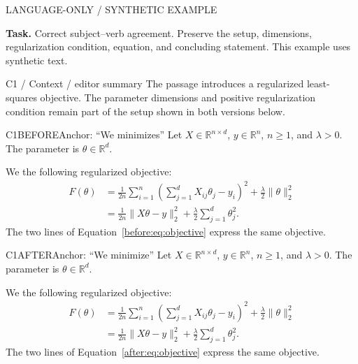 \documentclass[11pt]{article}
\begin{document}
{\small\color{rcMuted}LANGUAGE-ONLY / SYNTHETIC EXAMPLE}

\textbf{Task.} Correct subject--verb agreement. Preserve the setup, dimensions,
regularization condition, equation, and concluding statement.
This example uses synthetic text.

\begin{rcContext}{C1 / Context / editor summary}
The passage introduces a regularized least-squares objective. The parameter
dimensions and positive regularization condition remain part of the setup
shown in both versions below.
\end{rcContext}

\begin{rcPassage}{C1}{BEFORE}{Anchor: ``We minimizes''}
\renewcommand{\theequation}{B\arabic{equation}}
\renewcommand{\theHequation}{before.\arabic{equation}}
\setcounter{equation}{0}
Let $X\in\mathbb{R}^{n\times d}$, $y\in\mathbb{R}^{n}$,
$n\geq 1$, and $\lambda>0$. The parameter is $\theta\in\mathbb{R}^d$.

We  the following regularized objective:
\begin{align}
F(\theta)
 &= \frac{1}{2n}\sum_{i=1}^{n}
    \left(\sum_{j=1}^{d}X_{ij}\theta_j-y_i\right)^2
    +\frac{\lambda}{2}\|\theta\|_2^2 \label{before:eq:objective}\\
 &= \frac{1}{2n}\|X\theta-y\|_2^2
    +\frac{\lambda}{2}\sum_{j=1}^{d}\theta_j^2. \nonumber
\end{align}
The two lines of Equation~\eqref{before:eq:objective} express the same objective.
\end{rcPassage}

\begin{rcPassage}{C1}{AFTER}{Anchor: ``We minimize''}
\renewcommand{\theequation}{A\arabic{equation}}
\renewcommand{\theHequation}{after.\arabic{equation}}
\setcounter{equation}{0}
Let $X\in\mathbb{R}^{n\times d}$, $y\in\mathbb{R}^{n}$,
$n\geq 1$, and $\lambda>0$. The parameter is $\theta\in\mathbb{R}^d$.

We  the following regularized objective:
\begin{align}
F(\theta)
 &= \frac{1}{2n}\sum_{i=1}^{n}
    \left(\sum_{j=1}^{d}X_{ij}\theta_j-y_i\right)^2
    +\frac{\lambda}{2}\|\theta\|_2^2 \label{after:eq:objective}\\
 &= \frac{1}{2n}\|X\theta-y\|_2^2
    +\frac{\lambda}{2}\sum_{j=1}^{d}\theta_j^2. \nonumber
\end{align}
The two lines of Equation~\eqref{after:eq:objective} express the same objective.
\end{rcPassage}
\end{document}
